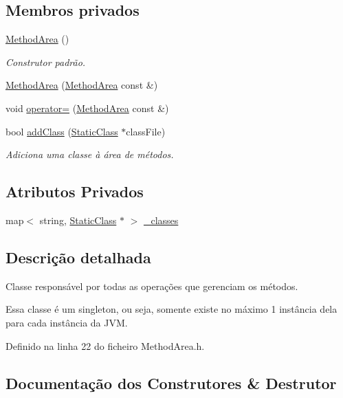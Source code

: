 \subsection*{Membros privados}
\begin{DoxyCompactItemize}
\item 
\hyperlink{classMethodArea_a6e9aac39975424e6c0ab3c29535aca75}{Method\+Area} ()
\begin{DoxyCompactList}\small\item\em Construtor padrão. \end{DoxyCompactList}\item 
\hyperlink{classMethodArea_a3a51cf2f998faa40ff46f17019f59e0a}{Method\+Area} (\hyperlink{classMethodArea}{Method\+Area} const \&)
\item 
void \hyperlink{classMethodArea_a02652b16a9bc28ceae405a9959cf4ee8}{operator=} (\hyperlink{classMethodArea}{Method\+Area} const \&)
\item 
bool \hyperlink{classMethodArea_a9e4e378de46c1a9836820d86cd9dadb8}{add\+Class} (\hyperlink{classStaticClass}{Static\+Class} $\ast$class\+File)
\begin{DoxyCompactList}\small\item\em Adiciona uma classe à área de métodos. \end{DoxyCompactList}\end{DoxyCompactItemize}
\subsection*{Atributos Privados}
\begin{DoxyCompactItemize}
\item 
map$<$ string, \hyperlink{classStaticClass}{Static\+Class} $\ast$ $>$ \hyperlink{classMethodArea_a1244d392d351920d754db8c6940dd7aa}{\+\_\+classes}
\end{DoxyCompactItemize}


\subsection{Descrição detalhada}
Classe responsável por todas as operações que gerenciam os métodos. 

Essa classe é um singleton, ou seja, somente existe no máximo 1 instância dela para cada instância da J\+VM. 

Definido na linha 22 do ficheiro Method\+Area.\+h.



\subsection{Documentação dos Construtores \& Destrutor}
\mbox{\label{classMethodArea_a79edf80f07f068f918907d8e2a3508b7}} 
